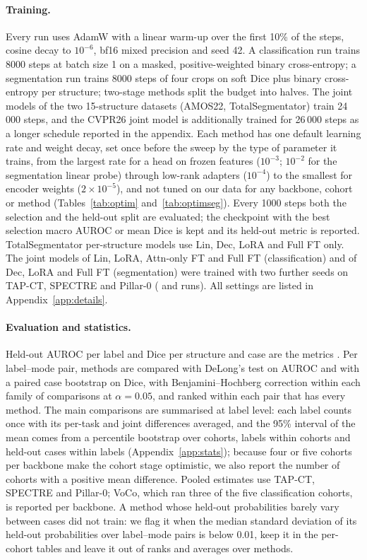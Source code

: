 \paragraph{Training.} Every run uses AdamW with a linear warm-up over the first 10\% of the steps, cosine decay to $10^{-6}$, bf16 mixed precision and seed 42. A classification run trains 8000 steps at batch size 1 on a masked, positive-weighted binary cross-entropy; a segmentation run trains 8000 steps of four crops on soft Dice plus binary cross-entropy per structure; two-stage methods split the budget into halves. The joint models of the two 15-structure datasets (AMOS22, TotalSegmentator) train 24\,000 steps, and the CVPR26 joint model is additionally trained for 26\,000 steps as a longer schedule reported in the appendix. Each method has one default learning rate and weight decay, set once before the sweep by the type of parameter it trains, from the largest rate for a head on frozen features ($10^{-3}$; $10^{-2}$ for the segmentation linear probe) through low-rank adapters ($10^{-4}$) to the smallest for encoder weights ($2\times10^{-5}$), and not tuned on our data for any backbone, cohort or method (Tables~\ref{tab:optim} and~\ref{tab:optimseg}). Every 1000 steps both the selection and the held-out split are evaluated; the checkpoint with the best selection macro AUROC or mean Dice is kept and its held-out metric is reported. TotalSegmentator per-structure models use Lin, Dec, LoRA and Full FT only. The joint models of Lin, LoRA, Attn-only FT and Full FT (classification) and of Dec, LoRA and Full FT (segmentation) were trained with two further seeds on TAP-CT, SPECTRE and Pillar-0 (\numSeedsclsRunsN{} and \numSeedssegRunsN{} runs). All settings are listed in Appendix~\ref{app:details}.

\paragraph{Evaluation and statistics.} Held-out AUROC per label and Dice per structure and case are the metrics \citep{maierhein2024metrics}. Per label--mode pair, methods are compared with DeLong's test on AUROC \citep{delong1988} and with a paired case bootstrap on Dice, with Benjamini--Hochberg correction \citep{benjamini1995fdr} within each family of comparisons at $\alpha=0.05$, and ranked within each pair that has every method. The main comparisons are summarised at label level: each label counts once with its per-task and joint differences averaged, and the 95\% interval of the mean comes from a percentile bootstrap over cohorts, labels within cohorts and held-out cases within labels (Appendix~\ref{app:stats}); because four or five cohorts per backbone make the cohort stage optimistic, we also report the number of cohorts with a positive mean difference. Pooled estimates use TAP-CT, SPECTRE and Pillar-0; VoCo, which ran three of the five classification cohorts, is reported per backbone. A method whose held-out probabilities barely vary between cases did not train: we flag it when the median standard deviation of its held-out probabilities over label--mode pairs is below 0.01, keep it in the per-cohort tables and leave it out of ranks and averages over methods.
